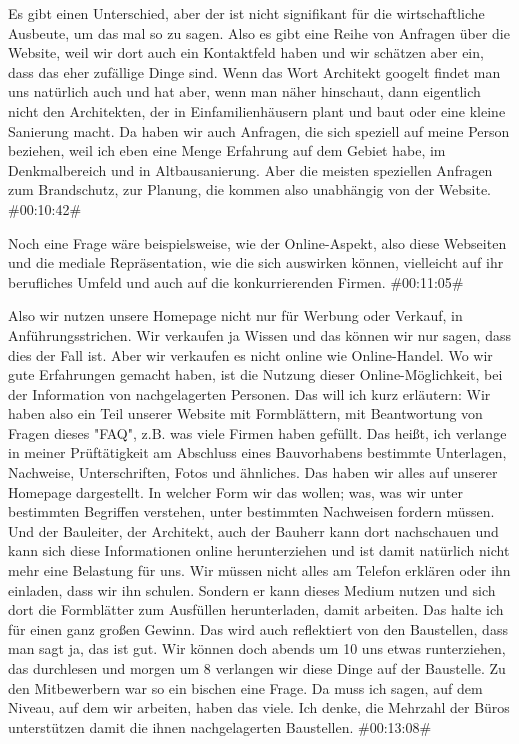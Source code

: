 \documentclass[a4paper, 12pt]{scrartcl}
\begin{document}
\begin{description}
\Andre Es gibt einen Unterschied, aber der ist nicht signifikant für die wirtschaftliche Ausbeute, um das mal so zu sagen. Also es gibt eine Reihe von Anfragen über die Website, weil wir dort auch ein Kontaktfeld haben und wir schätzen aber ein, dass das eher zufällige Dinge sind. Wenn das Wort Architekt googelt findet man uns natürlich auch und hat aber, wenn man näher hinschaut, dann eigentlich nicht den Architekten, der in Einfamilienhäusern plant und baut oder eine kleine Sanierung macht. Da haben wir auch Anfragen, die sich speziell auf meine Person beziehen, weil ich eben eine Menge Erfahrung auf dem Gebiet habe, im Denkmalbereich und in Altbausanierung. Aber die meisten speziellen Anfragen zum Brandschutz, zur Planung, die kommen also unabhängig von der Website. \#00:10:42\#

\Toni Noch eine Frage wäre beispielsweise, wie der Online-Aspekt, also diese Webseiten und die mediale Repräsentation, wie die sich auswirken können, vielleicht auf ihr berufliches Umfeld und auch auf die konkurrierenden Firmen. \#00:11:05\#

\Andre Also wir nutzen unsere Homepage nicht nur für Werbung oder Verkauf, in Anführungsstrichen. Wir verkaufen ja Wissen und das können wir nur sagen, dass dies der Fall ist. Aber wir verkaufen es nicht online wie Online-Handel. Wo wir gute Erfahrungen gemacht haben, ist die Nutzung dieser Online-Möglichkeit, bei der Information von nachgelagerten Personen. Das will ich kurz erläutern: Wir haben also ein Teil unserer Website mit Formblättern, mit Beantwortung von Fragen dieses "FAQ", z.B. was viele Firmen haben gefüllt. Das heißt, ich verlange in meiner Prüftätigkeit am Abschluss eines Bauvorhabens bestimmte Unterlagen, Nachweise, Unterschriften, Fotos und ähnliches. Das haben wir alles auf unserer Homepage dargestellt. In welcher Form wir das wollen; was, was wir unter bestimmten Begriffen verstehen, unter bestimmten Nachweisen fordern müssen. Und der Bauleiter, der Architekt, auch der Bauherr kann dort nachschauen und kann sich diese Informationen online herunterziehen und ist damit natürlich nicht mehr eine Belastung für uns. Wir müssen nicht alles am Telefon erklären oder ihn einladen, dass wir ihn schulen. Sondern er kann dieses Medium nutzen und sich dort die Formblätter zum Ausfüllen herunterladen, damit arbeiten. Das halte ich für einen ganz großen Gewinn. Das wird auch reflektiert von den Baustellen, dass man sagt ja, das ist gut. Wir können doch abends um 10 uns etwas runterziehen, das durchlesen und morgen um 8 verlangen wir diese Dinge auf der Baustelle. Zu den Mitbewerbern war so ein bischen eine Frage. Da muss ich sagen, auf dem Niveau, auf dem wir arbeiten, haben das viele. Ich denke, die Mehrzahl der Büros unterstützen damit die ihnen nachgelagerten Baustellen. \#00:13:08\#


\end{description}
\end{document}
